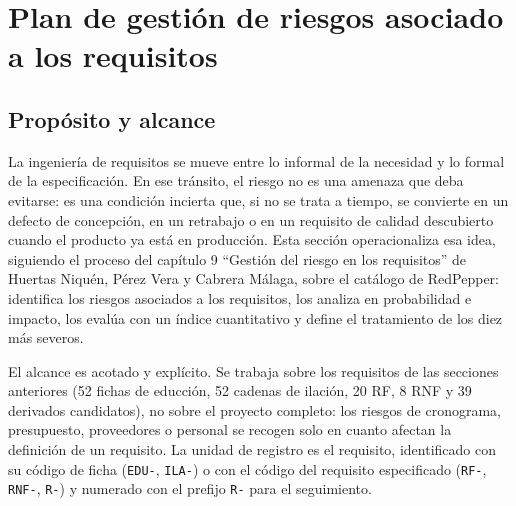


\clearpage
\section{Plan de gestión de riesgos asociado a los requisitos}
\label{sec:riesgos}

\par\vspace{0.5em}

\subsection{Propósito y alcance}
\label{subsec:riesgos-proposito}

La ingeniería de requisitos se mueve entre lo informal de la necesidad y lo
formal de la especificación. En ese tránsito, el riesgo no es una amenaza
que deba evitarse: es una condición incierta que, si no se trata a tiempo,
se convierte en un defecto de concepción, en un retrabajo o en un requisito
de calidad descubierto cuando el producto ya está en producción. Esta
sección operacionaliza esa idea, siguiendo el proceso del capítulo 9
\enquote{Gestión del riesgo en los requisitos} de Huertas Niquén, Pérez Vera
y Cabrera Málaga, sobre el catálogo de RedPepper: identifica
los riesgos asociados a los requisitos, los analiza en probabilidad e
impacto, los evalúa con un índice cuantitativo y define el tratamiento de
los diez más severos.

El alcance es acotado y explícito. Se trabaja sobre los requisitos de las
secciones anteriores (52 fichas de educción, 52 cadenas de ilación, 20 RF,
8 RNF y 39 derivados candidatos), no sobre el proyecto completo: los riesgos
de cronograma, presupuesto, proveedores o personal se recogen solo en
cuanto afectan la definición de un requisito. La unidad de registro es el
requisito, identificado con su código de ficha (\texttt{EDU-},
\texttt{ILA-}) o con el código del requisito especificado (\texttt{RF-},
\texttt{RNF-}, \texttt{R-}) y numerado con el prefijo \texttt{R-} para el
seguimiento.

